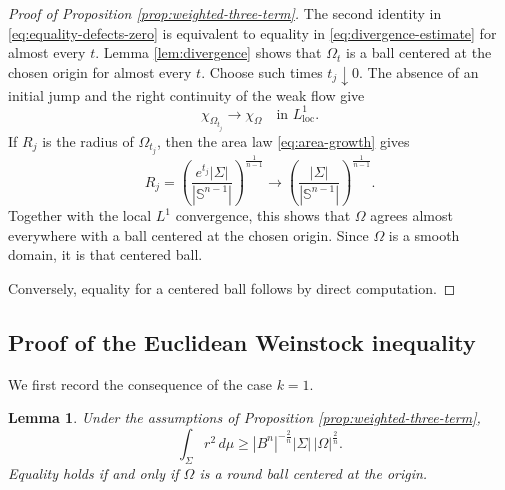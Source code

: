 \documentclass[11pt,reqno]{amsart}
\numberwithin{equation}{section}
\newtheorem{lemma}[theorem]{Lemma}
\theoremstyle{definition}
\newcommand{\Sn}{\mathbb S}
\newcommand{\Om}{\Omega}
\newcommand{\Sig}{\Sigma}
\begin{document}
\begin{proof}[Proof of Proposition \ref{prop:weighted-three-term}]
The second identity in \eqref{eq:equality-defects-zero} is equivalent to equality in \eqref{eq:divergence-estimate} for almost every $t$.  Lemma \ref{lem:divergence} shows that $\Om_t$ is a ball centered at the chosen origin for almost every $t$.  Choose such times $t_j\downarrow0$.  The absence of an initial jump and the right continuity of the weak flow give
\begin{equation*}
    \chi_{\Om_{t_j}}\longrightarrow\chi_\Om
    \quad\text{in }L^1_{\mathrm{loc}}.
\end{equation*}
If $R_j$ is the radius of $\Om_{t_j}$, then the area law \eqref{eq:area-growth} gives
\begin{equation*}
    R_j
    =\left(\frac{e^{t_j}|\Sig|}{|\Sn^{n-1}|}\right)^{\frac1{n-1}}
    \longrightarrow
    \left(\frac{|\Sig|}{|\Sn^{n-1}|}\right)^{\frac1{n-1}}.
\end{equation*}
Together with the local $L^1$ convergence, this shows that $\Om$ agrees almost everywhere with a ball centered at the chosen origin.  Since $\Om$ is a smooth domain, it is that centered ball.

Conversely, equality for a centered ball follows by direct computation.
\end{proof}

\subsection{Proof of the Euclidean Weinstock inequality}

We first record the consequence of the case $k=1$.

\begin{lemma}\label{lem:moment-lower}
Under the assumptions of Proposition \ref{prop:weighted-three-term},
\begin{equation*}
    \int_\Sig r^2\,d\mu
    \geq
    |B^n|^{-\frac2n}|\Sig|\,|\Om|^{\frac2n}.
\end{equation*}
Equality holds if and only if $\Om$ is a round ball centered at the origin.
\end{lemma}
\end{document}
